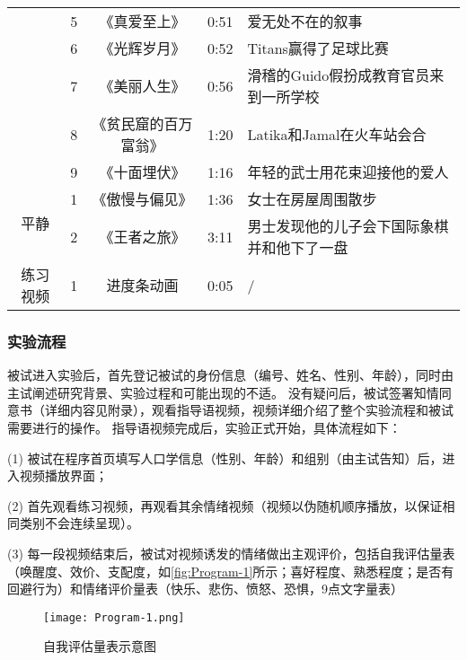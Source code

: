 \begin{table}[htbp]
{\begin{tabular}{ccccl}
                                & 5             & 《真爱至上》        & 0:51          & 爱无处不在的叙事                                                                 \\
                                & 6             & 《光辉岁月》        & 0:52          & Titans赢得了足球比赛                                                            \\
                                & 7             & 《美丽人生》        & 0:56          & 滑稽的Guido假扮成教育官员来到一所学校                                                    \\
                                & 8             & 《贫民窟的百万富翁》    & 1:20          & Latika和Jamal在火车站会合                                                       \\
                                & 9             & 《十面埋伏》        & 1:16          & 年轻的武士用花束迎接他的爱人                                                          \\ \midrule
            \multirow{2}{*}{平静}  & 1 & 《傲慢与偏见》 & 1:36 & 女士在房屋周围散步      \\          
                                 & 2             & 《王者之旅》        & 3:11          & 男士发现他的儿子会下国际象棋并和他下了一盘                                                       \\ \midrule
            练习视频 & 1 & 进度条动画 & 0:05 &  /   \\ \bottomrule
             \end{tabular}}
\end{table}

\subsubsection{实验流程}
被试进入实验后，首先登记被试的身份信息（编号、姓名、性别、年龄），同时由主试阐述研究背景、实验过程和可能出现的不适。
没有疑问后，被试签署知情同意书（详细内容见附录），观看指导语视频，视频详细介绍了整个实验流程和被试需要进行的操作。
指导语视频完成后，实验正式开始，具体流程如下：

(1)	被试在程序首页填写人口学信息（性别、年龄）和组别（由主试告知）后，进入视频播放界面；

(2)	首先观看练习视频，再观看其余情绪视频（视频以伪随机顺序播放，以保证相同类别不会连续呈现）。

(3)	每一段视频结束后，被试对视频诱发的情绪做出主观评价，包括自我评估量表（唤醒度、效价、支配度，如\autoref{fig:Program-1}所示；喜好程度、熟悉程度；是否有回避行为）和情绪评价量表（快乐、悲伤、愤怒、恐惧，9点文字量表）
\vspace{-1ex}
\begin{figure}[htbp]
    \centering
    \texttt{[image: Program-1.png]}
    \caption[自我评估量表示意图]{自我评估量表示意图}{\label{fig:Program-1}}
\end{figure}
\vspace{-3ex}


